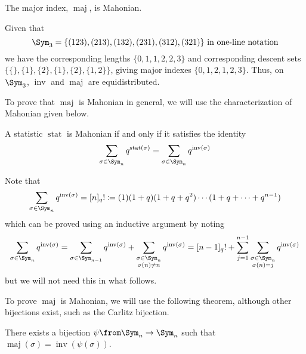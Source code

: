 \documentclass[11pt,leqno,oneside]{amsart}
\numberwithin{thm}{section}
\newcommand{\inv}{\operatorname{inv}}
\newcommand{\defeq}{\coloneqq}
\newcommand{\stat}{\operatorname{stat}}
\newcommand{\maj}{\operatorname{maj}}
\begin{document}
\begin{thm}
  The major index, \(\maj\), is Mahonian.
\end{thm}
\begin{example}
  Given that \[
    \Sym_3 = \{(123),(213),(132),(231),(312),(321)\} \text{ in
      one-line notation}
  \]
  we have the corresponding lengths \(\{0,1,1,2,2,3\}\) and
  corresponding descent sets
  \(\{\{\},\{1\},\{2\},\{1\},\{2\},\{1,2\}\}\), giving major indexes
  \(\{0,1,2,1,2,3\}\). Thus, on \(\Sym_3\), \(\inv\) and \(\maj\) are
  equidistributed. 
\end{example}
To prove that \(\maj\) is Mahonian in general, we will use the
characterization of Mahonian given below.
\begin{thm}
  A statistic \(\stat\) is Mahonian if and only if it satisfies the
  identity \[
    \sum_{\sigma \in \Sym_n} q^{\stat(\sigma)} = \sum_{\sigma \in
      \Sym_n} q^{\inv(\sigma)}
  \]
\end{thm}
\begin{rmk}
  Note that \[
    \sum_{\sigma \in \Sym_n} q^{\inv(\sigma)} = [n]_q! \defeq
    (1)(1+q)(1+q+q^2)\cdots (1+q+\cdots+q^{n-1})
  \]
  which can be proved using an inductive argument by noting \[
    \sum_{\sigma \in \Sym_n} q^{\inv(\sigma)} = \sum_{\sigma \in
      \Sym_{n-1}} q^{\inv(\sigma)} + \sum_{\substack{\sigma \in \Sym_n
      \\ \sigma(n) \neq n}} q^{\inv(\sigma)} = [n-1]_q! +
  \sum_{j=1}^{n-1} \sum_{\substack{\sigma \in \Sym_n \\ \sigma(n)=j}} q^{\inv(\sigma)}
  \]
  but we will not need this in what follows.
\end{rmk}
To prove \(\maj\) is Mahonian, we will use the following theorem,
although other bijections exist, such as the Carlitz bijection.
\begin{thm}
  There exists a bijection \(\psi \from \Sym_n \to \Sym_n\) such that
  \(\maj(\sigma) = \inv(\psi(\sigma))\).
\end{thm}
\end{document}
